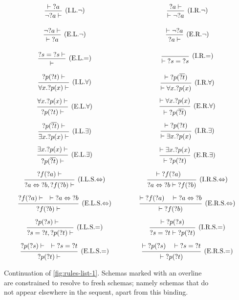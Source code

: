 \begin{figure}[H]
\begin{framed}
  $$\arraycolsep=0.75cm\def\arraystretch{3}\begin{array}{c c}
  \frule{\vdash {?a}}{\neg {?a} \vdash}{I.L.$\neg$} & \frule{{?a} \vdash}{\vdash \neg {?a}}{I.R.$\neg$} \\
  \frule{\neg {?a} \vdash}{\vdash {?a}}{E.L.$\neg$} & \frule{\vdash \neg {?a}}{{?a} \vdash}{E.R.$\neg$} \\
  \frule{{?s} = {?s} \vdash}{\vdash}{E.L.$=$} & \frule{}{\vdash {?s} = {?s}}{I.R.$=$} \\
  \frule{{?p}({?t}) \vdash}{\forall x. {?p}(x) \vdash}{I.L.$\forall$} & \frule{\vdash {?p}(\overline{?t})}{\vdash \forall x. {?p}(x)}{I.R.$\forall$} \\
  \frule{\forall x. {?p}(x) \vdash}{{?p}({?t}) \vdash}{E.L.$\forall$} & \frule{\vdash \forall x. {?p}(x)}{\vdash {?p}(\overline{?t})}{E.R.$\forall$} \\
  \frule{{?p}(\overline{?t}) \vdash}{\exists x. {?p}(x) \vdash}{I.L.$\exists$} & \frule{\vdash {?p}({?t})}{\vdash \exists x. {?p}(x)}{I.R.$\exists$} \\
  \frule{\exists x. {?p}(x) \vdash}{{?p}(\overline{?t}) \vdash}{E.L.$\exists$} & \frule{\vdash \exists x. {?p}(x)}{\vdash {?p}({?t})}{E.R.$\exists$} \\
  \frule{{?f}({?a}) \vdash}{{?a} \Leftrightarrow {?b}, {?f}({?b}) \vdash}{I.L.S.$\Leftrightarrow$} & \frule{\vdash {?f}({?a}) \quad}{{?a} \Leftrightarrow {?b} \vdash {?f}({?b})}{I.R.S.$\Leftrightarrow$} \\
  \frule{{?f}({?a}) \vdash \quad \vdash {?a} \Leftrightarrow {?b}}{{?f}({?b}) \vdash}{E.L.S.$\Leftrightarrow$} & \frule{\vdash {?f}({?a}) \quad \vdash {?a} \Leftrightarrow {?b}}{\vdash {?f}({?b})}{E.R.S.$\Leftrightarrow$} \\
  \frule{{?p}({?s}) \vdash \quad}{{?s} = {?t}, {?p}({?t}) \vdash}{I.L.S.$=$} & \frule{\vdash {?p}({?s})}{{?s} = {?t} \vdash {?p}({?t})}{I.R.S.$=$} \\
  \frule{{?p}({?s}) \vdash \quad \vdash {?s} = {?t}}{{?p}({?t}) \vdash}{E.L.S.$=$} & \frule{\vdash {?p}({?s}) \quad \vdash {?s} = {?t}}{\vdash {?p}({?t})}{E.R.S.$=$}
  \end{array}$$
  \end{framed}
  \caption[Rules (2)]{Continuation of \autoref{fig:rules-list-1}. Schemas marked with an overline are constrained to resolve to fresh schemas; namely schemas that do not appear elsewhere in the sequent, apart from this binding.}
  \label{fig:rules-list-2}
\end{figure}

